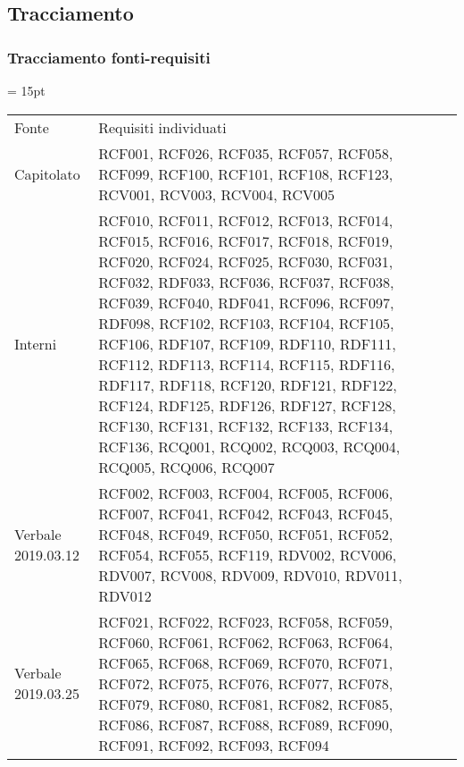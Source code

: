     
    
    \newpage


\subsection{Tracciamento}
    \subsubsection{Tracciamento fonti-requisiti}

    \tabulinesep = 15pt
    \everyrow{\tabucline[.4mm  white]{}}
    
    \begin{longtabu} {X[c] X[c]}
    \hline
    Fonte & Requisiti individuati \\ 
     {Capitolato} &  RCF001, RCF026, RCF035, RCF057, RCF058, RCF099, RCF100, RCF101, RCF108, RCF123, RCV001, RCV003, RCV004, RCV005 \\ 
                                
                               
     {Interni} & RCF010, RCF011, RCF012, RCF013, RCF014, RCF015, RCF016, RCF017, RCF018, RCF019, RCF020,
     RCF024, RCF025,
     RCF030, RCF031, RCF032, RDF033, 
     RCF036, RCF037, RCF038, RCF039, RCF040, RDF041,
     RCF096, RCF097, RDF098,
     RCF102, RCF103, RCF104, RCF105, RCF106, RDF107,
     RCF109, RDF110, RDF111, RCF112, RDF113, RCF114, RCF115, RDF116, RDF117, RDF118,
     RCF120, RDF121, RDF122,
     RCF124, RDF125, RDF126, RDF127,
     RCF128, RCF130, RCF131, RCF132, RCF133, RCF134, RCF136, RCQ001, RCQ002, RCQ003, RCQ004, RCQ005, RCQ006, RCQ007 \\  
     
     
                             
    {Verbale 2019.03.12} & RCF002, RCF003, RCF004, RCF005, RCF006, RCF007, RCF041, RCF042, RCF043, RCF045, RCF048, RCF049, RCF050, RCF051, RCF052, RCF054, RCF055, RCF119, RDV002, RCV006, RDV007, RCV008, RDV009, RDV010, RDV011, RDV012 \\                   
    
   
   
   {Verbale 2019.03.25} & RCF021, RCF022, RCF023, RCF058, RCF059, RCF060, RCF061, RCF062, RCF063, RCF064, RCF065, RCF068, RCF069, RCF070, RCF071, RCF072, RCF075, RCF076, RCF077, RCF078, RCF079, RCF080, RCF081, RCF082, RCF085, RCF086, RCF087, RCF088, RCF089, RCF090, RCF091, RCF092, RCF093, RCF094 \\ 
   

\end{longtabu}
